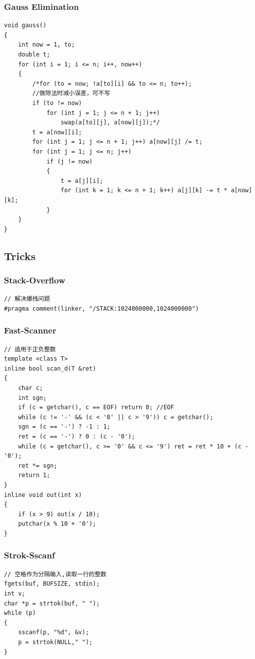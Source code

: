 \documentclass[twoside]{article}
\begin{document}
\subsubsection{Gauss Elimination}
\begin{lstlisting}
void gauss()
{
    int now = 1, to;
    double t;
    for (int i = 1; i <= n; i++, now++)
    {
        /*for (to = now; !a[to][i] && to <= n; to++);
        //做除法时减小误差，可不写
        if (to != now)
            for (int j = 1; j <= n + 1; j++)
                swap(a[to][j], a[now][j]);*/
        t = a[now][i];
        for (int j = 1; j <= n + 1; j++) a[now][j] /= t;
        for (int j = 1; j <= n; j++)
            if (j != now)
            {
                t = a[j][i];
                for (int k = 1; k <= n + 1; k++) a[j][k] -= t * a[now][k];
            }
    }
}
\end{lstlisting}
\subsection{Tricks}
\subsubsection{Stack-Overflow}
\begin{lstlisting}
// 解决爆栈问题
#pragma comment(linker, "/STACK:1024000000,1024000000")
\end{lstlisting}
\subsubsection{Fast-Scanner}
\begin{lstlisting}
// 适用于正负整数
template <class T>
inline bool scan_d(T &ret)
{
    char c;
    int sgn;
    if (c = getchar(), c == EOF) return 0; //EOF
    while (c != '-' && (c < '0' || c > '9')) c = getchar();
    sgn = (c == '-') ? -1 : 1;
    ret = (c == '-') ? 0 : (c - '0');
    while (c = getchar(), c >= '0' && c <= '9') ret = ret * 10 + (c - '0');
    ret *= sgn;
    return 1;
}
inline void out(int x)
{
    if (x > 9) out(x / 10);
    putchar(x % 10 + '0');
}
\end{lstlisting}
\subsubsection{Strok-Sscanf}
\begin{lstlisting}
// 空格作为分隔输入,读取一行的整数
fgets(buf, BUFSIZE, stdin);
int v;
char *p = strtok(buf, " ");
while (p)
{
    sscanf(p, "%d", &v);
    p = strtok(NULL," ");
}
\end{lstlisting}
\end{document}
